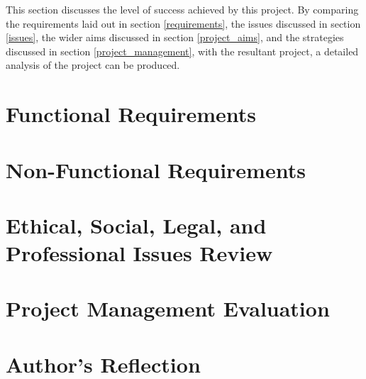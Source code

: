 This section discusses the level of success achieved by this project. By comparing the requirements laid out in section \ref{requirements}, the issues discussed in section \ref{issues}, the wider aims discussed in section \ref{project_aims}, and the strategies discussed in section \ref{project_management}, with the resultant project, a detailed analysis of the project can be produced.

\section{Functional Requirements}
\label{evaluation_functional_requirements}


\section{Non-Functional Requirements}
\label{evaluation_non_functional_requirements}


\section{Ethical, Social, Legal, and Professional Issues Review}
\label{ethical_social_legal_and_professional_issues_review}


\section{Project Management Evaluation}
\label{evaluation_project_management}


\section{Author's Reflection}
\label{authors_reflection}

